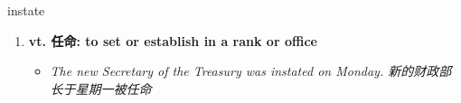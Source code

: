 
\begin{frame}
{\huge instate}
\begin{center}
\begin{enumerate}\Large
  \item \textbf{vt. 任命: to set or establish in a rank or office}
  \begin{itemize}
    \item \em{\Large{The new Secretary of the Treasury was instated on Monday. 新的财政部长于星期一被任命}}
  \end{itemize}
\end{enumerate}
\end{center}
\end{frame}
